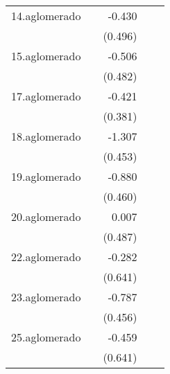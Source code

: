 {\begin{longtable}{l*{4}{D{.}{.}{-1}}}
\addlinespace
14.aglomerado&                     &      -0.430         &                     &                     \\
            &                     &     (0.496)         &                     &                     \\
\addlinespace
15.aglomerado&                     &      -0.506         &                     &                     \\
            &                     &     (0.482)         &                     &                     \\
\addlinespace
17.aglomerado&                     &      -0.421         &                     &                     \\
            &                     &     (0.381)         &                     &                     \\
\addlinespace
18.aglomerado&                     &      -1.307\sym{**} &                     &                     \\
            &                     &     (0.453)         &                     &                     \\
\addlinespace
19.aglomerado&                     &      -0.880         &                     &                     \\
            &                     &     (0.460)         &                     &                     \\
\addlinespace
20.aglomerado&                     &       0.007         &                     &                     \\
            &                     &     (0.487)         &                     &                     \\
\addlinespace
22.aglomerado&                     &      -0.282         &                     &                     \\
            &                     &     (0.641)         &                     &                     \\
\addlinespace
23.aglomerado&                     &      -0.787         &                     &                     \\
            &                     &     (0.456)         &                     &                     \\
\addlinespace
25.aglomerado&                     &      -0.459         &                     &                     \\
            &                     &     (0.641)         &                     &                     \\

\end{longtable}}
